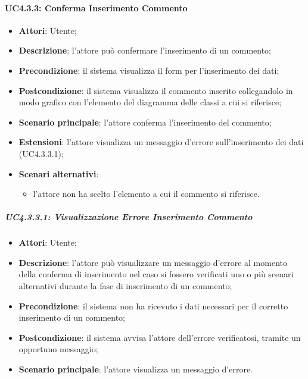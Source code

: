 \begin{itemize}
\begin{itemize}
\begin{itemize}
\begin{itemize}
\paragraph{UC4.3.3: Conferma Inserimento Commento}
\label{UC4.3.3}
\begin{itemize}
	\item \textbf{Attori}: Utente;
	\item \textbf{Descrizione}: l'attore può confermare l'inserimento di un commento;
	\item \textbf{Precondizione}: il sistema visualizza il form per l'inserimento dei dati;
	\item \textbf{Postcondizione}: il sistema visualizza il commento inserito collegandolo in modo grafico con l'elemento del diagramma delle classi a cui si riferisce;
	\item \textbf{Scenario principale}: l'attore conferma l'inserimento del commento;
	\item \textbf{Estensioni}: l'attore visualizza un messaggio d'errore sull'inserimento dei dati (UC4.3.3.1);
	\item \textbf{Scenari alternativi}:
	\begin{itemize}
		\item l'attore non ha scelto l'elemento a cui il commento si riferisce.
	\end{itemize}
\end{itemize}

\subparagraph{UC4.3.3.1: Visualizzazione Errore Inserimento Commento}
\label{UC4.3.3.1}
\begin{itemize}
	\item \textbf{Attori}: Utente;
	\item \textbf{Descrizione}: l'attore può visualizzare un messaggio d'errore al momento della conferma di inserimento nel caso si fossero verificati uno o più scenari alternativi durante la fase di inserimento di un commento;
	\item \textbf{Precondizione}: il sistema non ha ricevuto i dati necessari per il corretto inserimento di un commento;
	\item \textbf{Postcondizione}: il sistema avvisa l'attore dell'errore verificatosi, tramite un opportuno messaggio;
	\item \textbf{Scenario principale}: l'attore visualizza un messaggio d'errore.
\end{itemize}


\end{itemize}
\end{itemize}
\end{itemize}
\end{itemize}
